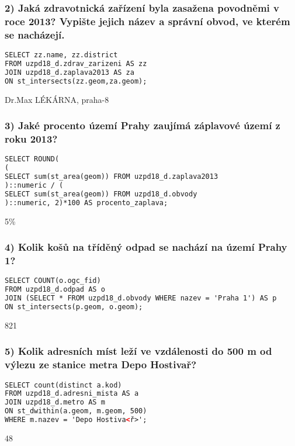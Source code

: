 \documentclass[a4paper, 12pt]{article}
\begin{document}
\subsubsection*{2) Jaká zdravotnická zařízení byla zasažena povodněmi v roce 2013? Vypište jejich název a správní obvod, ve kterém se nacházejí.}
\begin{lstlisting}[language=html]
SELECT zz.name, zz.district 
FROM uzpd18_d.zdrav_zarizeni AS zz
JOIN uzpd18_d.zaplava2013 AS za 
ON st_intersects(zz.geom,za.geom);
\end{lstlisting}
Dr.Max LÉKÁRNA, praha-8
\vspace{0.8cm}

\subsubsection*{3) Jaké procento území Prahy zaujímá záplavové území z roku 2013?}
\begin{lstlisting}[language=html]
SELECT ROUND(
(
SELECT sum(st_area(geom)) FROM uzpd18_d.zaplava2013
)::numeric / (
SELECT sum(st_area(geom)) FROM uzpd18_d.obvody
)::numeric, 2)*100 AS procento_zaplava;
\end{lstlisting}
5\%
\vspace{0.8cm}

\subsubsection*{4) Kolik košů na tříděný odpad se nachází na území Prahy 1?}
\begin{lstlisting}[language=html]
SELECT COUNT(o.ogc_fid) 
FROM uzpd18_d.odpad AS o
JOIN (SELECT * FROM uzpd18_d.obvody WHERE nazev = 'Praha 1') AS p
ON st_intersects(p.geom, o.geom);
\end{lstlisting}
821
\vspace{0.8cm}

\subsubsection*{5) Kolik adresních míst leží ve vzdálenosti do 500 m od výlezu ze stanice metra Depo Hostivař?}
\begin{lstlisting}[language=html]
SELECT count(distinct a.kod) 
FROM uzpd18_d.adresni_mista AS a
JOIN uzpd18_d.metro AS m
ON st_dwithin(a.geom, m.geom, 500)
WHERE m.nazev = 'Depo Hostiva<ř>';
\end{lstlisting}
48
\vspace{0.8cm}
\end{document}
